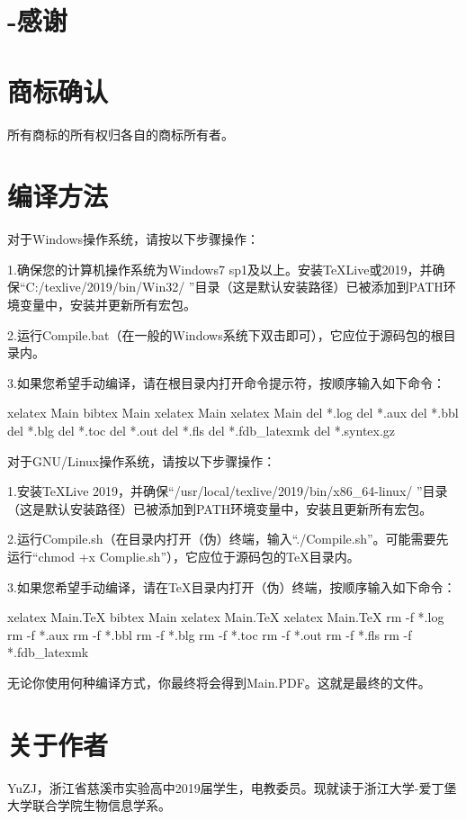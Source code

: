 \documentclass{book}
\begin{document}
\section{-感谢}
\section{商标确认}
所有商标的所有权归各自的商标所有者。
\section{编译方法}
对于Windows操作系统，请按以下步骤操作：\par
1.确保您的计算机操作系统为Windows7 sp1及以上。安装TeXLive或2019，并确保“C:/texlive/2019/bin/Win32/ ”目录（这是默认安装路径）已被添加到PATH环境变量中，安装并更新所有宏包。\par
2.运行Compile.bat（在一般的Windows系统下双击即可），它应位于源码包的根目录内。\par
3.如果您希望手动编译，请在根目录内打开命令提示符，按顺序输入如下命令：
\begin{verbatim*}
xelatex Main
bibtex Main
xelatex Main
xelatex Main
del *.log
del *.aux
del *.bbl
del *.blg
del *.toc
del *.out
del *.fls
del *.fdb_latexmk
del *.syntex.gz
\end{verbatim*}
对于GNU/Linux操作系统，请按以下步骤操作：\par
1.安装TeXLive 2019，并确保“/usr/local/texlive/2019/bin/x86\_64-linux/ ”目录（这是默认安装路径）已被添加到PATH环境变量中，安装且更新所有宏包。\par
2.运行Compile.sh（在目录内打开（伪）终端，输入“./Compile.sh”。可能需要先运行“chmod +x Complie.sh”），它应位于源码包的TeX目录内。\par
3.如果您希望手动编译，请在TeX目录内打开（伪）终端，按顺序输入如下命令：
\begin{verbatim*}
xelatex Main.TeX
bibtex Main
xelatex Main.TeX
xelatex Main.TeX
rm -f *.log
rm -f *.aux
rm -f *.bbl
rm -f *.blg
rm -f *.toc
rm -f *.out
rm -f *.fls
rm -f *.fdb_latexmk
\end{verbatim*}
无论你使用何种编译方式，你最终将会得到Main.PDF。这就是最终的文件。
\section{关于作者}
YuZJ，浙江省慈溪市实验高中2019届学生，电教委员。现就读于浙江大学-爱丁堡大学联合学院生物信息学系。

\end{document}
